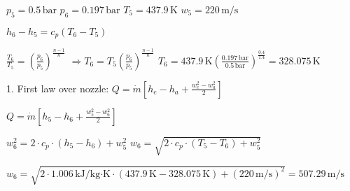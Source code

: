 \( p_5 = 0.5 \, \text{bar} \)  
\( p_6 = 0.197 \, \text{bar} \)  
\( T_5 = 437.9 \, \text{K} \)  
\( w_5 = 220 \, \text{m/s} \)  

\( h_6 - h_5 = c_p (T_6 - T_5) \)  

\( \frac{T_6}{T_5} = \left( \frac{p_6}{p_5} \right)^{\frac{n-1}{n}} \)  
\( \Rightarrow T_6 = T_5 \left( \frac{p_6}{p_5} \right)^{\frac{n-1}{n}} \)  
\( T_6 = 437.9 \, \text{K} \left( \frac{0.197 \, \text{bar}}{0.5 \, \text{bar}} \right)^{\frac{0.4}{1.4}} = 328.075 \, \text{K} \)  

1. First law over nozzle:  
\( Q = \dot{m} \left[ h_e - h_a + \frac{w_e^2 - w_a^2}{2} \right] \)  

\( Q = \dot{m} \left[ h_5 - h_6 + \frac{w_5^2 - w_6^2}{2} \right] \)  

\( w_6^2 = 2 \cdot c_p \cdot (h_5 - h_6) + w_5^2 \)  
\( w_6 = \sqrt{2 \cdot c_p \cdot (T_5 - T_6) + w_5^2} \)  

\( w_6 = \sqrt{2 \cdot 1.006 \, \text{kJ/kg·K} \cdot (437.9 \, \text{K} - 328.075 \, \text{K}) + (220 \, \text{m/s})^2} = 507.29 \, \text{m/s} \)